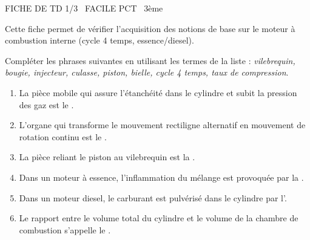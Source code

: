 \documentclass[11pt]{article}
\begin{document}
\begin{tcolorbox}[enhanced,colback=popink,colframe=popink,arc=10pt,boxrule=0pt,left=12pt,right=12pt,top=9pt,bottom=9pt]
{\color{white}\popxbold\small FICHE DE TD 1/3 \textbullet\ FACILE \hfill PCT \textbullet\ 3ème\par}
\end{tcolorbox}
\vspace{4pt}
\noindent Cette fiche permet de vérifier l'acquisition des notions de base sur le moteur à combustion interne (cycle 4 temps, essence/diesel).

\begin{exercice}
Compléter les phrases suivantes en utilisant les termes de la liste : \textit{vilebrequin, bougie, injecteur, culasse, piston, bielle, cycle 4 temps, taux de compression}.
\begin{enumerate}
    \item La pièce mobile qui assure l'étanchéité dans le cylindre et subit la pression des gaz est le \dotfill.
    \item L'organe qui transforme le mouvement rectiligne alternatif en mouvement de rotation continu est le \dotfill.
    \item La pièce reliant le piston au vilebrequin est la \dotfill.
    \item Dans un moteur à essence, l'inflammation du mélange est provoquée par la \dotfill.
    \item Dans un moteur diesel, le carburant est pulvérisé dans le cylindre par l'\dotfill.
    \item Le rapport entre le volume total du cylindre et le volume de la chambre de combustion s'appelle le \dotfill.
\end{enumerate}
\end{exercice}
\end{document}
